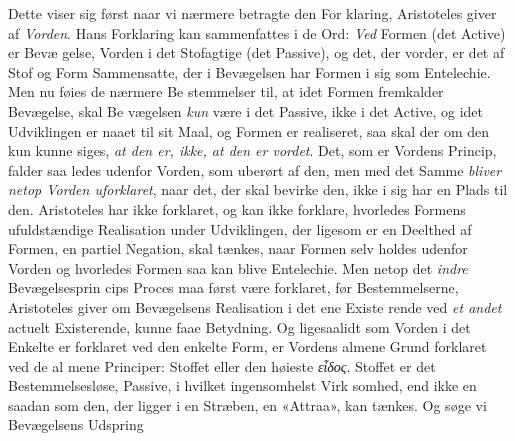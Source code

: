 \documentclass[12pt,a4paper]{book}
\newcommand{\gk}[1]{\textit{#1}}
\begin{document}
Dette viser sig først naar vi nærmere betragte den For\-%
klaring, Aristoteles giver af \emph{Vorden}. Hans Forklaring kan
sammenfattes i de Ord: \emph{Ved} Formen (det Active) er Bevæ\-%
gelse, Vorden i det Stofagtige (det Passive), og det, der vorder,
er det af Stof og Form Sammensatte, der i Bevægelsen har
Formen i sig som Entelechie. Men nu føies de nærmere Be\-%
stemmelser til, at idet Formen fremkalder Bevægelse, skal Be\-%
vægelsen \emph{kun} være i det Passive, ikke i det Active, og idet
Udviklingen er naaet til sit Maal, og Formen er realiseret,
saa skal der om den kun kunne siges, \emph{at den er, ikke, at
den er vordet}. Det, som er Vordens Princip, falder saa\-%
ledes udenfor Vorden, som uberørt af den, men med det
Samme \emph{bliver netop Vorden uforklaret}, naar det, der
skal bevirke den, ikke i sig har en Plads til den. Aristoteles
har ikke forklaret, og kan ikke forklare, hvorledes Formens
ufuldstændige Realisation under Udviklingen, der ligesom er
en Deelthed af Formen, en partiel Negation, skal tænkes, naar
Formen selv holdes udenfor Vorden og hvorledes Formen saa
kan blive Entelechie. Men netop det \emph{indre} Bevægelsesprin\-%
cips Proces maa først være forklaret, før Bestemmelserne,
Aristoteles giver om Bevægelsens Realisation i det ene Existe\-%
rende ved \emph{et andet} actuelt Existerende, kunne faae Betydning.
Og ligesaalidt som Vorden i det Enkelte er forklaret ved den
enkelte Form, er Vordens almene Grund forklaret ved de al\-%
mene Principer: Stoffet eller den høieste \gk{εἶδος}. Stoffet er
det Bestemmelsesløse, Passive, i hvilket ingensomhelst Virk\-%
somhed, end ikke en saadan som den, der ligger i en Stræben,
en «Attraa», kan tænkes. Og søge vi Bevægelsens Udspring
\end{document}
